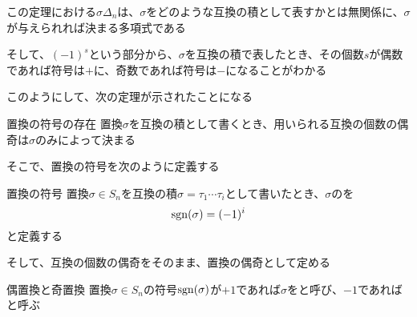\documentclass[../../../topic_linear-algebra]{subfiles}
\begin{document}
この定理における$\sigma\Delta_n$は、$\sigma$をどのような互換の積として表すかとは無関係に、$\sigma$が与えられれば決まる多項式である

\br

そして、$(-1)^s$という部分から、$\sigma$を互換の積で表したとき、その個数$s$が偶数であれば符号は$+$に、奇数であれば符号は$-$になることがわかる

\br

このようにして、次の定理が示されたことになる

\begin{theorem}{置換の符号の存在}
  置換$\sigma$を互換の積として書くとき、用いられる互換の個数の偶奇は$\sigma$のみによって決まる
\end{theorem}

そこで、置換の符号を次のように定義する

\begin{definition}{置換の符号}
  置換$\sigma \in S_n$を互換の積$\sigma = \tau_1 \cdots \tau_i$として書いたとき、$\sigma$のを
  \begin{equation*}
    \operatorname{sgn}(\sigma) = (-1)^i
  \end{equation*}
  と定義する
\end{definition}

そして、互換の個数の偶奇をそのまま、置換の偶奇として定める

\begin{definition}{偶置換と奇置換}
  置換$\sigma \in S_n$の符号$\operatorname{sgn}(\sigma)$が$+1$であれば$\sigma$をと呼び、$-1$であればと呼ぶ
\end{definition}
\end{document}
